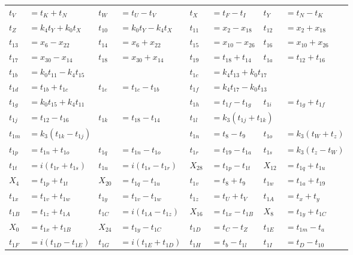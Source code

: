 \begin{tabular}{|p{4.3pt}l|p{4.3pt}l|p{4.3pt}l|p{4.3pt}l|}
$t_V $ &$= t_K + t_N$ & $t_W $ &$= t_U - t_V$ & $t_X $ &$= t_F - t_I$ & $t_Y $ &$= t_N - t_K$\\ 
$t_Z $ &$= k_4t_Y + k_0t_X$ & $t_{10} $ &$= k_0t_Y - k_4t_X$ & $t_{11} $ &$= x_2 - x_{18}$ & $t_{12} $ &$= x_2 + x_{18}$\\ 
$t_{13} $ &$= x_6 - x_{22}$ & $t_{14} $ &$= x_6 + x_{22}$ & $t_{15} $ &$= x_{10} - x_{26}$ & $t_{16} $ &$= x_{10} + x_{26}$\\ 
$t_{17} $ &$= x_{30} - x_{14}$ & $t_{18} $ &$= x_{30} + x_{14}$ & $t_{19} $ &$= t_{18} + t_{14}$ & $t_{1a} $ &$= t_{12} + t_{16}$\\ 
$t_{1b} $ &\multicolumn{3}{l|}{$= k_0t_{11} - k_4t_{15}$} & $t_{1c} $ &\multicolumn{3}{l|}{$= k_4t_{13} + k_0t_{17}$}\\ 
$t_{1d} $ &$= t_{1b} + t_{1c}$ & $t_{1e} $ &$= t_{1c} - t_{1b}$ & $t_{1f} $ &\multicolumn{3}{l|}{$= k_4t_{17} - k_0t_{13}$}\\ 
$t_{1g} $ &\multicolumn{3}{l|}{$= k_0t_{15} + k_4t_{11}$} & $t_{1h} $ &$= t_{1f} - t_{1g}$ & $t_{1i} $ &$= t_{1g} + t_{1f}$\\ 
$t_{1j} $ &$= t_{12} - t_{16}$ & $t_{1k} $ &$= t_{18} - t_{14}$ & $t_{1l} $ &\multicolumn{3}{l|}{$= k_3(t_{1j} + t_{1k})$}\\ 
$t_{1m} $ &\multicolumn{3}{l|}{$= k_3(t_{1k} - t_{1j})$} & $t_{1n} $ &$= t_8 - t_9$ & $t_{1o} $ &$= k_3(t_W + t_z)$\\ 
$t_{1p} $ &$= t_{1n} + t_{1o}$ & $t_{1q} $ &$= t_{1n} - t_{1o}$ & $t_{1r} $ &$= t_{19} - t_{1a}$ & $t_{1s} $ &$= k_3(t_z - t_W)$\\ 
$t_{1t} $ &$= i(t_{1r} + t_{1s})$ & $t_{1u} $ &$= i(t_{1s} - t_{1r})$ & $X_{28} $ &$= t_{1p} - t_{1t}$ & $X_{12} $ &$= t_{1q} + t_{1u}$\\ 
$X_4 $ &$= t_{1p} + t_{1t}$ & $X_{20} $ &$= t_{1q} - t_{1u}$ & $t_{1v} $ &$= t_8 + t_9$ & $t_{1w} $ &$= t_{1a} + t_{19}$\\ 
$t_{1x} $ &$= t_{1v} + t_{1w}$ & $t_{1y} $ &$= t_{1v} - t_{1w}$ & $t_{1z} $ &$= t_U + t_V$ & $t_{1A} $ &$= t_x + t_y$\\ 
$t_{1B} $ &$= t_{1z} + t_{1A}$ & $t_{1C} $ &$= i(t_{1A} - t_{1z})$ & $X_{16} $ &$= t_{1x} - t_{1B}$ & $X_8 $ &$= t_{1y} + t_{1C}$\\ 
$X_0 $ &$= t_{1x} + t_{1B}$ & $X_{24} $ &$= t_{1y} - t_{1C}$ & $t_{1D} $ &$= t_C - t_Z$ & $t_{1E} $ &$= t_{1m} - t_a$\\ 
$t_{1F} $ &$= i(t_{1D} - t_{1E})$ & $t_{1G} $ &$= i(t_{1E} + t_{1D})$ & $t_{1H} $ &$= t_b - t_{1l}$ & $t_{1I} $ &$= t_D - t_{10}$\\ 

\end{tabular}
